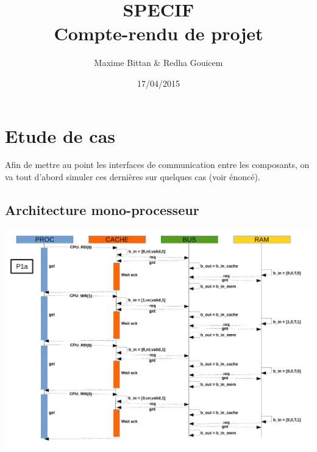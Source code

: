 \documentclass[a4paper, 11pt]{article}
\begin{document}
 
\title{SPECIF\\Compte-rendu de projet}
\author{Maxime Bittan \& Redha Gouicem}
\date{17/04/2015}
 
\maketitle

\section{Etude de cas}
Afin de mettre au point les interfaces de communication entre les
composants, on va tout d'abord simuler ces dernières sur quelques cas
(voir énoncé).
\subsection{Architecture mono-processeur}
\begin{center}
\centerline{\includegraphics[scale=0.5]{images/seq1.pdf}}
\end{center}
\end{document}
